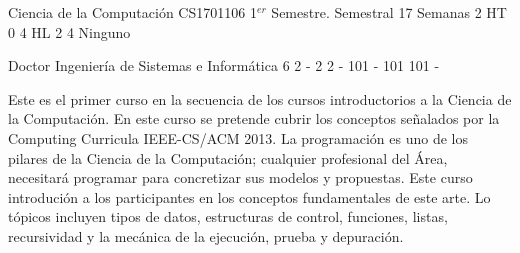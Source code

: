 \documentclass[a4paper,8pt]{article}
\begin{document}
\setNombreProfesor{}
\setGradoProfesorAbreviado{}
\sylabusHeader

\academicaTable
{Ciencia de la Computación} %
{CS1701106} %
{1$^{er}$ Semestre.} %
{Semestral} %
{17 Semanas} %
{2 HT} %
{} %
{0} %
{4 HL}  %
{2} %
{4} %
{Ninguno} %

\administrativaTable
{Doctor} %
{Ingeniería de Sistemas e Informática} %
{6} %
{2} %
{-} %
{2} %
{2} %
{-} %
{101} %
{-} %
{101} %
{101} %
{-} %


\begin{fundamentacion}
Este es el primer curso en la secuencia de los cursos introductorios a la Ciencia de la Computación. 
En este curso se pretende cubrir los conceptos señalados por la Computing Curricula IEEE-CS/ACM 2013.
La programación es uno de los pilares de la Ciencia de la Computación; cualquier profesional del Área, necesitará programar para concretizar sus modelos y propuestas.
Este curso introdución a los participantes en los conceptos fundamentales de este arte. 
Lo tópicos incluyen tipos de datos, estructuras de control, funciones, listas, recursividad y la mecánica de la ejecución, prueba y depuración.

\end{fundamentacion}

\begin{sumilla}
\item \SPHistory
\item \PLBasicTypeSystems
\item \SDFFundamentalProgrammingConcepts
\item \ALBasicAnalysis
\item \ALFundamentalDataStructuresandAlgorithms
\item \SDFAlgorithmsandDesign
\item \SDFDevelopmentMethods

\end{sumilla}
\end{document}
